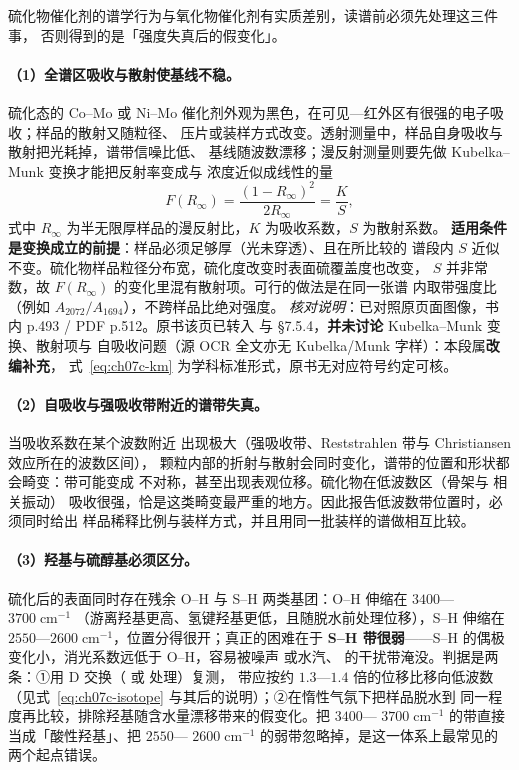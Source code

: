 硫化物催化剂的谱学行为与氧化物催化剂有实质差别，读谱前必须先处理这三件事，
否则得到的是「强度失真后的假变化」。

\paragraph{（1）全谱区吸收与散射使基线不稳。}硫化态的 Co--Mo 或 Ni--Mo
催化剂外观为黑色，在可见—红外区有很强的电子吸收；样品的散射又随粒径、
压片或装样方式改变。透射测量中，样品自身吸收与散射把光耗掉，谱带信噪比低、
基线随波数漂移；漫反射测量则要先做 Kubelka--Munk 变换才能把反射率变成与
浓度近似成线性的量
\begin{equation}
  F(R_{\infty})=\frac{(1-R_{\infty})^{2}}{2R_{\infty}}=\frac{K}{S},
  \label{eq:ch07c-km}
\end{equation}
式中 $R_{\infty}$ 为半无限厚样品的漫反射比，$K$ 为吸收系数，$S$ 为散射系数。
\textbf{适用条件是变换成立的前提}：样品必须足够厚（光未穿透）、且在所比较的
谱段内 $S$ 近似不变。硫化物样品粒径分布宽，硫化度改变时表面硫覆盖度也改变，
$S$ 并非常数，故 $F(R_{\infty})$ 的变化里混有散射项。可行的做法是在同一张谱
内取带强度比（例如 $A_{2072}/A_{1694}$），不跨样品比绝对强度。
\emph{核对说明}：已对照原页面图像，书内 p.493 / PDF p.512。原书该页已转入
 与 §7.5.4，\textbf{并未讨论} Kubelka--Munk 变换、散射项与
自吸收问题（源 OCR 全文亦无 Kubelka/Munk 字样）：本段属\textbf{改编补充}，
式~\eqref{eq:ch07c-km} 为学科标准形式，原书无对应符号约定可核。

\paragraph{（2）自吸收与强吸收带附近的谱带失真。}当吸收系数在某个波数附近
出现极大（强吸收带、Reststrahlen 带与 Christiansen 效应所在的波数区间），
颗粒内部的折射与散射会同时变化，谱带的位置和形状都会畸变：带可能变成
不对称，甚至出现表观位移。硫化物在低波数区（骨架与  相关振动）
吸收很强，恰是这类畸变最严重的地方。因此报告低波数带位置时，必须同时给出
样品稀释比例与装样方式，并且用同一批装样的谱做相互比较。

\paragraph{（3）羟基与硫醇基必须区分。}硫化后的表面同时存在残余
O--H 与 S--H 两类基团：O--H 伸缩在 $3400$—$3700\;\mathrm{cm^{-1}}$
（游离羟基更高、氢键羟基更低，且随脱水前处理位移），S--H 伸缩在
$2550$—$2600\;\mathrm{cm^{-1}}$，位置分得很开；真正的困难在于
\textbf{S--H 带很弱}——S--H 的偶极变化小，消光系数远低于 O--H，容易被噪声
或水汽、 的干扰带淹没。判据是两条：①用 D 交换（ 或
 处理）复测， 带应按约 $1.3$—$1.4$ 倍的位移比移向低波数
（见式~\eqref{eq:ch07c-isotope} 与其后的说明）；②在惰性气氛下把样品脱水到
同一程度再比较，排除羟基随含水量漂移带来的假变化。把 $3400$—
$3700\;\mathrm{cm^{-1}}$ 的带直接当成「酸性羟基」、把 $2550$—
$2600\;\mathrm{cm^{-1}}$ 的弱带忽略掉，是这一体系上最常见的两个起点错误。

